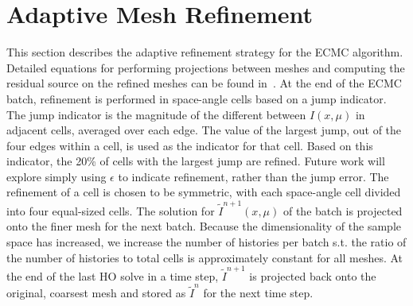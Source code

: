 \section{Adaptive Mesh Refinement}
\label{app:refinement}
This section describes the adaptive refinement strategy for the ECMC algorithm.
Detailed equations for performing projections between meshes and computing the residual source on
the refined meshes can be found in~\cite{jake}.  At the end of the ECMC batch,
refinement is performed in space-angle cells based on a jump indicator.  The jump
indicator is the magnitude of the different between $I(x,\mu)$ in adjacent cells,
averaged over each edge.  The value of the largest jump, out of the four edges within a
cell, is used as the
indicator for that cell.  Based on this indicator, the 20\% of cells with the largest jump are
refined.  Future work will explore simply using $\epsilon$ to indicate refinement,
rather than the jump error.  The refinement of a cell is chosen to be symmetric, with each space-angle cell divided into four
equal-sized cells.  The solution for $\tilde{I}^{n+1}(x,\mu)$ of the batch is projected onto
the finer mesh for the next batch. Because the dimensionality of the sample space has
increased, we increase the number of histories per batch s.t. the ratio of the number
of histories to total cells is approximately constant for all meshes.  At the end of the last HO solve in a time step,
$\tilde{I}^{n+1}$ is projected back onto the original, coarsest mesh and stored as
$\tilde{I}^{n}$ for the next time step.
